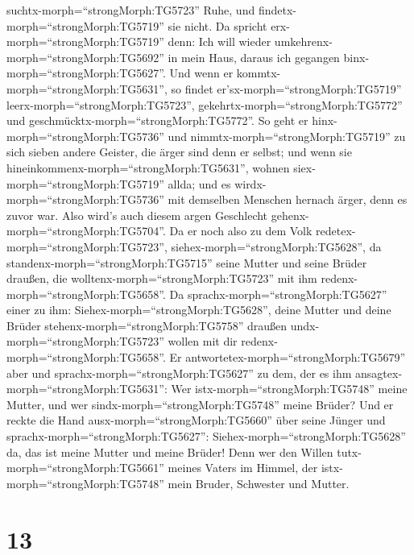suchtx-morph=``strongMorph:TG5723'' Ruhe, und
findetx-morph=``strongMorph:TG5719'' sie nicht.  Da spricht
erx-morph=``strongMorph:TG5719'' denn: Ich will wieder
umkehrenx-morph=``strongMorph:TG5692'' in mein Haus, daraus ich gegangen
binx-morph=``strongMorph:TG5627''. Und wenn er
kommtx-morph=``strongMorph:TG5631'', so findet
er'sx-morph=``strongMorph:TG5719'' leerx-morph=``strongMorph:TG5723'',
gekehrtx-morph=``strongMorph:TG5772'' und
geschmücktx-morph=``strongMorph:TG5772''.  So geht er
hinx-morph=``strongMorph:TG5736'' und
nimmtx-morph=``strongMorph:TG5719'' zu sich sieben andere Geister, die
ärger sind denn er selbst; und wenn sie
hineinkommenx-morph=``strongMorph:TG5631'', wohnen
siex-morph=``strongMorph:TG5719'' allda; und es
wirdx-morph=``strongMorph:TG5736'' mit demselben Menschen hernach ärger,
denn es zuvor war. Also wird's auch diesem argen Geschlecht
gehenx-morph=``strongMorph:TG5704''.  Da er noch also zu
dem Volk redetex-morph=``strongMorph:TG5723'',
siehex-morph=``strongMorph:TG5628'', da
standenx-morph=``strongMorph:TG5715'' seine Mutter und seine Brüder
draußen, die wolltenx-morph=``strongMorph:TG5723'' mit ihm
redenx-morph=``strongMorph:TG5658''.  Da
sprachx-morph=``strongMorph:TG5627'' einer zu ihm:
Siehex-morph=``strongMorph:TG5628'', deine Mutter und deine Brüder
stehenx-morph=``strongMorph:TG5758'' draußen
undx-morph=``strongMorph:TG5723'' wollen mit dir
redenx-morph=``strongMorph:TG5658''.  Er
antwortetex-morph=``strongMorph:TG5679'' aber und
sprachx-morph=``strongMorph:TG5627'' zu dem, der es ihm
ansagtex-morph=``strongMorph:TG5631'': Wer
istx-morph=``strongMorph:TG5748'' meine Mutter, und wer
sindx-morph=``strongMorph:TG5748'' meine Brüder?  Und er
reckte die Hand ausx-morph=``strongMorph:TG5660'' über seine Jünger und
sprachx-morph=``strongMorph:TG5627'':
Siehex-morph=``strongMorph:TG5628'' da, das ist meine Mutter und meine
Brüder!  Denn wer den Willen
tutx-morph=``strongMorph:TG5661'' meines Vaters im Himmel, der
istx-morph=``strongMorph:TG5748'' mein Bruder, Schwester und Mutter.

\hypertarget{section-12}{%
\section{13}\label{section-12}}

